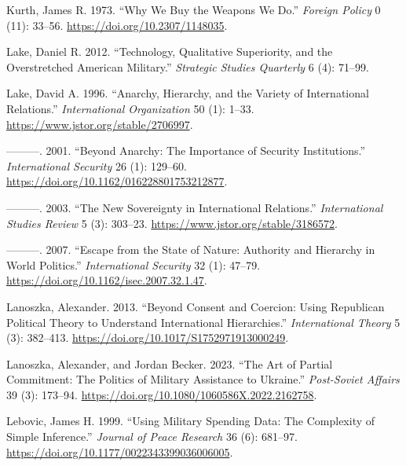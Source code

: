 \documentclass[
  12,
  letterpaper,
  DIV=11,
  numbers=noendperiod]{scrartcl}
\newlength{\cslhangindent}
\newlength{\cslentryspacingunit} %
\newenvironment{CSLReferences}[2] %
 {%
  \setlength{\parindent}{0pt}
  \ifodd #1
  \let\oldpar\par
  \def\par{\hangindent=\cslhangindent\oldpar}
  \fi
  \setlength{\parskip}{#2\cslentryspacingunit}
 }%
 {}
\begin{document}
\begin{CSLReferences}{1}{0}
\leavevmode{}%
Kurth, James R. 1973. {``Why {We Buy} the {Weapons We Do}.''}
\emph{Foreign Policy} 0 (11): 33--56.
\url{https://doi.org/10.2307/1148035}.

\leavevmode{}%
Lake, Daniel R. 2012. {``Technology, {Qualitative Superiority}, and the
{Overstretched American Military}.''} \emph{Strategic Studies Quarterly}
6 (4): 71--99.

\leavevmode{}%
Lake, David A. 1996. {``Anarchy, {Hierarchy}, and the {Variety} of
{International Relations}.''} \emph{International Organization} 50 (1):
1--33. \url{https://www.jstor.org/stable/2706997}.

\leavevmode{}%
---------. 2001. {``Beyond {Anarchy}: {The Importance} of {Security
Institutions}.''} \emph{International Security} 26 (1): 129--60.
\url{https://doi.org/10.1162/016228801753212877}.

\leavevmode{}%
---------. 2003. {``The {New Sovereignty} in {International
Relations}.''} \emph{International Studies Review} 5 (3): 303--23.
\url{https://www.jstor.org/stable/3186572}.

\leavevmode{}%
---------. 2007. {``Escape from the {State} of {Nature}: {Authority} and
{Hierarchy} in {World Politics}.''} \emph{International Security} 32
(1): 47--79. \url{https://doi.org/10.1162/isec.2007.32.1.47}.

\leavevmode{}%
Lanoszka, Alexander. 2013. {``Beyond Consent and Coercion: Using
Republican Political Theory to Understand International Hierarchies.''}
\emph{International Theory} 5 (3): 382--413.
\url{https://doi.org/10.1017/S1752971913000249}.

\leavevmode{}%
Lanoszka, Alexander, and Jordan Becker. 2023. {``The Art of Partial
Commitment: The Politics of Military Assistance to {Ukraine}.''}
\emph{Post-Soviet Affairs} 39 (3): 173--94.
\url{https://doi.org/10.1080/1060586X.2022.2162758}.

\leavevmode{}%
Lebovic, James H. 1999. {``Using {Military Spending Data}: {The
Complexity} of {Simple Inference}.''} \emph{Journal of Peace Research}
36 (6): 681--97. \url{https://doi.org/10.1177/0022343399036006005}.


\end{CSLReferences}
\end{document}
